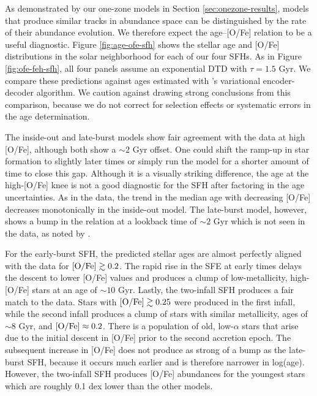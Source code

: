 \documentclass[twocolumn,twocolappendix,linenumbers]{aastex631}
\begin{document}
As demonstrated by our one-zone models in Section \ref{sec:onezone-results}, models that produce similar tracks in abundance space can be distinguished by the rate of their abundance evolution. We therefore expect the age--[O/Fe] relation to be a useful diagnostic. Figure \ref{fig:age-ofe-sfh} shows the stellar age and [O/Fe] distributions in the solar neighborhood for each of our four SFHs. As in Figure \ref{fig:ofe-feh-sfh}, all four panels assume an exponential DTD with $\tau=1.5$ Gyr. We compare these predictions against ages estimated with 's variational encoder-decoder algorithm. We caution against drawing strong conclusions from this comparison, because we do not correct for selection effects or systematic errors in the age determination. 

The inside-out and late-burst models show fair agreement with the data at high [O/Fe], although both show a $\sim2$ Gyr offset. One could shift the ramp-up in star formation to slightly later times or simply run the model for a shorter amount of time to close this gap. Although it is a visually striking difference, the age at the high-[O/Fe] knee is not a good diagnostic for the SFH after factoring in the age uncertainties. As in the data, the trend in the median age with decreasing [O/Fe] decreases monotonically in the inside-out model. The late-burst model, however, shows a bump in the relation at a lookback time of $\sim2$ Gyr which is not seen in the data, as noted by .

For the early-burst SFH, the predicted stellar ages are almost perfectly aligned with the data for ${\rm [O/Fe]}\gtrsim 0.2$. The rapid rise in the SFE at early times delays the descent to lower [O/Fe] values and produces a clump of low-metallicity, high-[O/Fe] stars at an age of $\sim10$ Gyr. 
Lastly, the two-infall SFH produces a fair match to the data. Stars with ${\rm [O/Fe]}\gtrsim 0.25$ were produced in the first infall, while the second infall produces a clump of stars with similar metallicity, ages of $\sim8$ Gyr, and ${\rm [O/Fe]}\approx0.2$. There is a population of old, low-$\alpha$ stars that arise due to the initial descent in [O/Fe] prior to the second accretion epoch. The subsequent increase in [O/Fe] does not produce as strong of a bump as the late-burst SFH, because it occurs much earlier and is therefore narrower in log(age). However, the two-infall SFH produces [O/Fe] abundances for the youngest stars which are roughly 0.1 dex lower than the other models.
\end{document}
